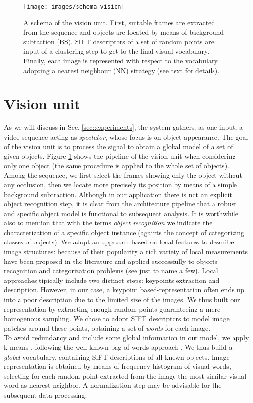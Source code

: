 \begin{figure}
	\centering
	\texttt{[image: images/schema\_vision]}
	\caption{A schema of the vision unit. First, suitable frames are extracted from the sequence and objects are located by means of background subtaction (BS). SIFT descriptors of a set of random points are input of a clustering step to get to the final visual vocabulary. Finally, each image is represented with respect to the vocabulary adopting a nearest neighbour (NN) strategy (see text for details).}
	\label{fig::vision}
\end{figure}

\section{Vision unit}
\label{sec::vision}
As we will discuss in Sec. \ref{sec::experiments}, the system gathers, as one input, a video sequence acting as {\it spectator}, whose focus is on object appearance. The goal of the vision unit is to process the signal to obtain a global model of a set of given objects.
Figure \ref{fig::vision} shows the pipeline of the vision unit when considering only one object (the same procedure is applied to the whole set of objects). Among the sequence, we first select the frames showing only the object  without any occlusion, then we locate more precisely its position by means of a simple background subtraction. 
Although in our application there is not an explicit object recognition step, it is clear from the architecture pipeline that a robust and specific object model is functional to subsequent analysis. It is worthwhile also to mention that with the terms {\it object recognition} we indicate the characterization of a specific object instance (againts the concept of categorizing classes of objects).
We adopt an approach based on local features to describe image structures: because of their popularity a rich variety of local measurements have been proposed in the literature \cite{harris,schmid,lowe} and applied successfully to objects recognition and categorization problems (see \cite{csurka,ferrari} just to name a few). 
Local approaches tipically include two distinct steps: keypoints extraction and description. 
However, in our case, a keypoint based-representation often ends up into a poor description
due to the limited size of the images. We thus built our representation by extracting enough 
random points  guaranteeing a more homogenous sampling.
We chose to adopt SIFT descriptors \cite{lowe,schmid2} to model image patches around these points, obtaining a set of {\it words} for each image.\\
To avoid redundancy and include some global information in our model, we apply k-means \cite{wong}, following the well-known bag-of-words approach \cite{csurka}. 
We thus build a {\it global} vocabulary, containing SIFT descriptions of all known objects. 
Image representation is obtained by means of frequency histogram of visual words, selecting for each random point extracted from the image 
the most similar visual word as nearest neighbor. A normalization step may be advisable for the subsequent data processing.